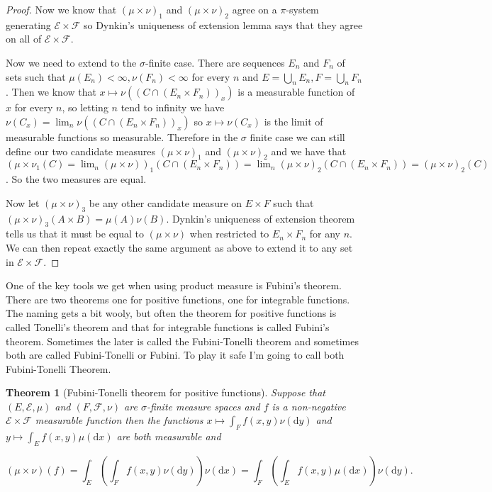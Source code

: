 \documentclass[
]{book}
\newtheorem{theorem}{Theorem}[chapter]
\theoremstyle{definition}
\theoremstyle{definition}
\theoremstyle{definition}
\theoremstyle{definition}
\theoremstyle{remark}
\begin{document}
\begin{proof}
Now we know that \((\mu \times \nu)_1\) and \((\mu \times \nu)_2\) agree on a \(\pi\)-system generating \(\mathcal{E} \times \mathcal{F}\) so Dynkin's uniqueness of extension lemma says that they agree on all of \(\mathcal{E} \times \mathcal{F}\).

Now we need to extend to the \(\sigma\)-finite case. There are sequences \(E_n\) and \(F_n\) of sets such that \(\mu(E_n)<\infty, \nu(F_n)< \infty\) for every \(n\) and \(E= \bigcup_n E_n, F = \bigcup_n F_n\). Then we know that \(x \mapsto \nu((C \cap (E_n \times F_n))_x)\) is a measurable function of \(x\) for every \(n\), so letting \(n\) tend to infinity we have \(\nu(C_x) = \lim_n \nu((C \cap (E_n \times F_n))_x)\) so \(x \mapsto \nu(C_x)\) is the limit of measurable functions so measurable. Therefore in the \(\sigma\) finite case we can still define our two candidate measures \((\mu \times \nu)_1\) and \((\mu \times \nu)_2\) and we have that \((\mu \times \nu_1(C) = \lim_n (\mu \times \nu))_1(C \cap (E_n \times F_n)) = \lim_n (\mu \times \nu)_2 ( C \cap (E_n \times F_n)) = (\mu \times \nu)_2 (C)\). So the two measures are equal.

Now let \((\mu \times \nu)_3\) be any other candidate measure on \(E \times F\) such that \((\mu \times \nu)_3 (A \times B) = \mu(A) \nu(B)\). Dynkin's uniqueness of extension theorem tells us that it must be equal to \((\mu \times \nu)\) when restricted to \(E_n \times F_n\) for any \(n\). We can then repeat exactly the same argument as above to extend it to any set in \(\mathcal{E} \times \mathcal{F}\).
\end{proof}

One of the key tools we get when using product measure is Fubini's theorem. There are two theorems one for positive functions, one for integrable functions. The naming gets a bit wooly, but often the theorem for positive functions is called Tonelli's theorem and that for integrable functions is called Fubini's theorem. Sometimes the later is called the Fubini-Tonelli theorem and sometimes both are called Fubini-Tonelli or Fubini. To play it safe I'm going to call both Fubini-Tonelli Theorem.

\begin{theorem}[Fubini-Tonelli theorem for positive functions]
Suppose that \((E, \mathcal{E}, \mu)\) and \((F, \mathcal{F}, \nu)\) are \(\sigma\)-finite measure spaces and \(f\) is a non-negative \(\mathcal{E} \times \mathcal{F}\) measurable function then the functions \(x \mapsto \int_F f(x,y) \nu(\mathrm{d}y)\) and \(y \mapsto \int_E f(x,y) \mu(\mathrm{d}x)\) are both measurable and

\[(\mu \times \nu)(f) = \int_E \left( \int_F f(x,y) \nu(\mathrm{d}y) \right) \nu(\mathrm{d}x) = \int_F \left( \int_E f(x,y) \mu(\mathrm{d}x) \right) \nu(\mathrm{d}y). \]
\end{theorem}
\end{document}
